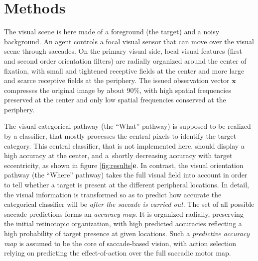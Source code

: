 \section{Methods}


\CNS

The visual scene is here made of a foreground (the target) and a noisy background. An agent controls a focal visual sensor that can move over the visual scene through saccades. 
On the primary visual side, local visual features (first and second order orientation filters) are radially organized around the center of fixation, with small and tightened receptive fields at the center and more large and scarce receptive fields at the periphery. The issued observation vector $\boldsymbol{x}$ compresses the original image by about 90\%, with high spatial frequencies preserved at the center and only low spatial frequencies conserved at the periphery. 

The visual categorical pathway (the ``What'' pathway) is supposed to be realized by a classifier, that mostly processes the central pixels to identify the target category. This central classifier, that is not implemented here, should display a high accuracy at the center, and a shortly decreasing accuracy with target eccentricity, as shown in figure \ref{fig:results}{\bf e}.
In contrast, the visual orientation pathway (the ``Where'' pathway) takes the full visual field into account in order to tell whether a target is present at the different peripheral locations. In detail, the visual information is  transformed so as to predict how accurate the categorical classifier will be \emph{after the saccade is carried out}. The set of all possible saccade predictions forms an \emph{accuracy map}. It is organized radially, preserving the initial retinotopic organization, with high predicted accuracies reflecting a high probability of target presence at given locations. Such  a \emph{predictive accuracy map} is assumed to be the core of saccade-based vision, with action selection relying on predicting the effect-of-action over the full saccadic motor map.

